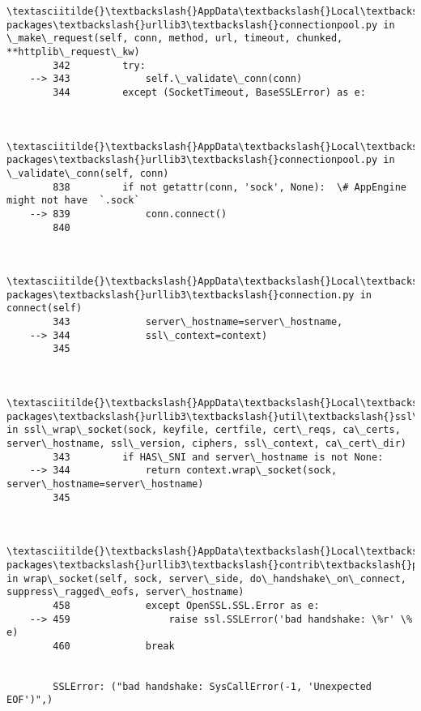 \documentclass[11pt]{article}
\begin{document}
\begin{Verbatim}[commandchars=\\\{\}]
        \textasciitilde{}\textbackslash{}AppData\textbackslash{}Local\textbackslash{}Continuum\textbackslash{}anaconda3\textbackslash{}lib\textbackslash{}site-packages\textbackslash{}urllib3\textbackslash{}connectionpool.py in \_make\_request(self, conn, method, url, timeout, chunked, **httplib\_request\_kw)
        342         try:
    --> 343             self.\_validate\_conn(conn)
        344         except (SocketTimeout, BaseSSLError) as e:
    

        \textasciitilde{}\textbackslash{}AppData\textbackslash{}Local\textbackslash{}Continuum\textbackslash{}anaconda3\textbackslash{}lib\textbackslash{}site-packages\textbackslash{}urllib3\textbackslash{}connectionpool.py in \_validate\_conn(self, conn)
        838         if not getattr(conn, 'sock', None):  \# AppEngine might not have  `.sock`
    --> 839             conn.connect()
        840 
    

        \textasciitilde{}\textbackslash{}AppData\textbackslash{}Local\textbackslash{}Continuum\textbackslash{}anaconda3\textbackslash{}lib\textbackslash{}site-packages\textbackslash{}urllib3\textbackslash{}connection.py in connect(self)
        343             server\_hostname=server\_hostname,
    --> 344             ssl\_context=context)
        345 
    

        \textasciitilde{}\textbackslash{}AppData\textbackslash{}Local\textbackslash{}Continuum\textbackslash{}anaconda3\textbackslash{}lib\textbackslash{}site-packages\textbackslash{}urllib3\textbackslash{}util\textbackslash{}ssl\_.py in ssl\_wrap\_socket(sock, keyfile, certfile, cert\_reqs, ca\_certs, server\_hostname, ssl\_version, ciphers, ssl\_context, ca\_cert\_dir)
        343         if HAS\_SNI and server\_hostname is not None:
    --> 344             return context.wrap\_socket(sock, server\_hostname=server\_hostname)
        345 
    

        \textasciitilde{}\textbackslash{}AppData\textbackslash{}Local\textbackslash{}Continuum\textbackslash{}anaconda3\textbackslash{}lib\textbackslash{}site-packages\textbackslash{}urllib3\textbackslash{}contrib\textbackslash{}pyopenssl.py in wrap\_socket(self, sock, server\_side, do\_handshake\_on\_connect, suppress\_ragged\_eofs, server\_hostname)
        458             except OpenSSL.SSL.Error as e:
    --> 459                 raise ssl.SSLError('bad handshake: \%r' \% e)
        460             break
    

        SSLError: ("bad handshake: SysCallError(-1, 'Unexpected EOF')",)


\end{Verbatim}
\end{document}
